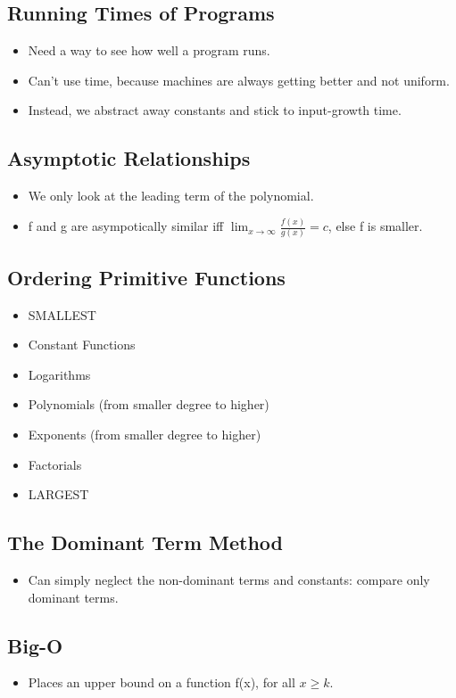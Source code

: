 \subsection{Running Times of Programs}
\begin{itemize}
    \item Need a way to see how well a program runs.
    \item Can't use time, because machines are always getting better and not uniform.
    \item Instead, we abstract away constants and stick to input-growth time.
\end{itemize}

\subsection{Asymptotic Relationships}
\begin{itemize}
    \item We only look at the leading term of the polynomial.
    \item f and g are asympotically similar iff $\lim_{x\rightarrow\infty}{\frac{f(x)}{g(x)}} = c$, else f is smaller.
\end{itemize}

\subsection{Ordering Primitive Functions}
\begin{itemize}
    \item SMALLEST
    \item Constant Functions
    \item Logarithms
    \item Polynomials (from smaller degree to higher)
    \item Exponents (from smaller degree to higher)
    \item Factorials
    \item LARGEST
\end{itemize}

\subsection{The Dominant Term Method}
\begin{itemize}
    \item Can simply neglect the non-dominant terms and constants: compare only dominant terms.
\end{itemize}

\subsection{Big-O}
\begin{itemize}
    \item Places an upper bound on a function f(x), for all $x\geq k$.
\end{itemize}